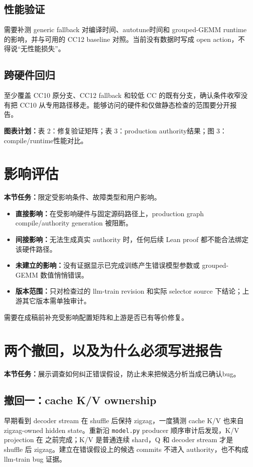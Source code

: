 \documentclass[11pt,a4paper]{ctexart}
\newcommand{\contract}[1]{\par\smallskip\noindent\colorbox{light}{\parbox{0.95\linewidth}{\textbf{本节任务：}#1}}\par\smallskip}
\newcommand{\figplan}[1]{\par\noindent\textbf{图表计划：}#1\par}
\begin{document}
\subsection{性能验证}
需要补测 generic fallback 对编译时间、autotune时间和 grouped-GEMM runtime 的影响，并与可用的 CC12 baseline 对照。当前没有数据时写成 open action，不得说“无性能损失”。

\subsection{跨硬件回归}
至少覆盖 CC10 原分支、CC12 fallback 和较低 CC 的既有分支，确认条件收窄没有把 CC10 从专用路径移走。能够访问的硬件和仅做静态检查的范围要分开报告。

\figplan{表 2：修复验证矩阵；表 3：production authority结果；图 3：compile/runtime性能对比。}

\section{影响评估}
\contract{限定受影响条件、故障类型和用户影响。}

\begin{itemize}
  \item \textbf{直接影响：}在受影响硬件与固定源码路径上，production graph compile/authority generation 被阻断。
  \item \textbf{间接影响：}无法生成真实 authority 时，任何后续 Lean proof 都不能合法绑定该硬件路径。
  \item \textbf{未建立的影响：}没有证据显示已完成训练产生错误模型参数或 grouped-GEMM 数值悄悄错误。
  \item \textbf{版本范围：}只对检查过的 llm-train revision 和实际 selector source 下结论；上游其它版本需单独审计。
\end{itemize}

需要在成稿前补充受影响配置矩阵和上游是否已有等价修复。

\section{两个撤回，以及为什么必须写进报告}
\contract{展示调查如何纠正错误假设，防止未来把候选分析当成已确认bug。}

\subsection{撤回一：cache K/V ownership}
早期看到 decoder stream 在 shuffle 后保持 zigzag，一度猜测 cache K/V 也来自 zigzag-owned hidden state。重新沿 \texttt{model.py} producer 顺序审计后发现，K/V projection 在  之前完成；K/V 是普通连续 shard，Q 和 decoder stream 才是 shuffle 后 zigzag。建立在错误假设上的候选 commits 不进入 authority，也不构成 llm-train bug 证据。
\end{document}
